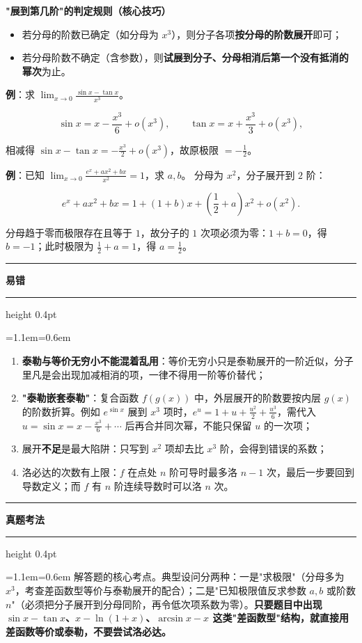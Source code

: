 \documentclass[11pt,openany,UTF8]{ctexbook}
\newcommand{\callouthead}[2]{%
  \par\addvspace{7pt}\noindent
  {\color{#1}\rule[-0.15em]{3pt}{1.05em}}\hspace{0.5em}%
  {\bfseries\color{#1}#2}\par\nobreak\vspace{-0.35em}%
  {\color{rulesep}\hrule height 0.4pt}\nobreak\vspace{0.45em}%
  \begingroup\small\setlength{\parindent}{0pt}%
  \leftskip=1.1em\rightskip=0.6em\noindent\ignorespaces}
\newcommand{\calloutend}{\par\endgroup\addvspace{7pt}}
\newenvironment{callwarn}[1]{\callouthead{warnbar}{#1}}{\calloutend}
\newenvironment{callexam}[1]{\callouthead{exambar}{#1}}{\calloutend}
\begin{document}
\textbf{"展到第几阶"的判定规则（核心技巧）}

\begin{itemize}
\item 若分母的阶数已确定（如分母为 $x^{3}$），则分子各项\textbf{按分母的阶数展开}即可；
\item 若分母阶数不确定（含参数），则\textbf{试展到分子、分母相消后第一个没有抵消的幂次}为止。
\end{itemize}
\textbf{例}：求 $\lim_{x\to 0}\frac{\sin x-\tan x}{x^{3}}$。

\[\sin x=x-\frac{x^{3}}{6}+o(x^{3}),\qquad \tan x=x+\frac{x^{3}}{3}+o(x^{3}),\]

相减得 $\sin x-\tan x=-\frac{x^{3}}{2}+o(x^{3})$，故原极限 $=-\frac12$。

\textbf{例}：已知 $\lim_{x\to 0}\frac{e^{x}+ax^{2}+bx}{x^{2}}=1$，求 $a,b$。 分母为 $x^{2}$，分子展开到 $2$ 阶：

\[e^{x}+ax^{2}+bx=1+(1+b)x+\left(\frac12+a\right)x^{2}+o(x^{2}).\]

分母趋于零而极限存在且等于 $1$，故分子的 $1$ 次项必须为零：$1+b=0$，得 $b=-1$；此时极限为 $\frac12+a=1$，得 $a=\frac12$。

\begin{callwarn}{易错}
\begin{enumerate}
\item \textbf{泰勒与等价无穷小不能混着乱用}：等价无穷小只是泰勒展开的一阶近似，分子里凡是会出现加减相消的项，一律不得用一阶等价替代；
\item \textbf{"泰勒嵌套泰勒"}：复合函数 $f(g(x))$ 中，外层展开的阶数要按内层 $g(x)$ 的阶数折算。例如 $e^{\sin x}$ 展到 $x^3$ 项时，$e^{u}=1+u+\frac{u^2}{2}+\frac{u^3}{6}$，需代入 $u=\sin x=x-\frac{x^3}{6}+\cdots$ 后再合并同次幂，不能只保留 $u$ 的一次项；
\item 展开\textbf{不足}是最大陷阱：只写到 $x^{2}$ 项却去比 $x^{3}$ 阶，会得到错误的系数；
\item 洛必达的次数有上限：$f$ 在点处 $n$ 阶可导时最多洛 $n-1$ 次，最后一步要回到导数定义；而 $f$ 有 $n$ 阶连续导数时可以洛 $n$ 次。
\end{enumerate}
\end{callwarn}

\begin{callexam}{真题考法}
解答题的核心考点。典型设问分两种：一是"求极限"（分母多为 $x^{3}$，考查差函数型等价与泰勒展开的配合）；二是"已知极限值反求参数 $a,b$ 或阶数 $n$"（必须把分子展开到分母同阶，再令低次项系数为零）。\textbf{只要题目中出现 $\sin x-\tan x$、$x-\ln(1+x)$、$\arcsin x-x$ 这类"差函数型"结构，就直接用差函数等价或泰勒，不要尝试洛必达。}

\end{callexam}
\end{document}
